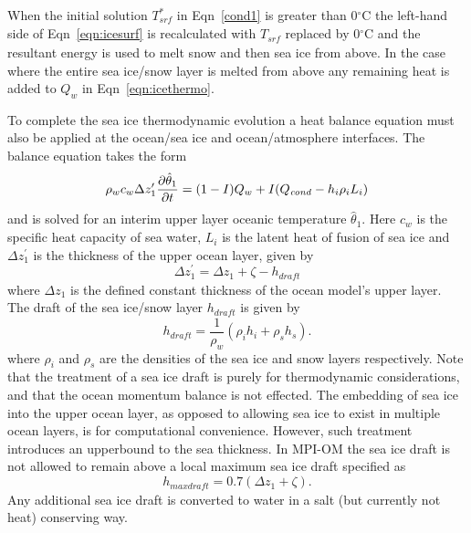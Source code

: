 When the initial solution $T_{\mathit{srf}}^{\ast}$ in Eqn~\ref{cond1}
is greater than 0$^{\circ}$C
the left-hand side of Eqn~\ref{eqn:icesurf} is recalculated with
$T_{\mathit{srf}}$ replaced by 0$^{\circ}$C and the resultant
energy  is used to melt snow and then sea ice from above.
In the case where the entire sea ice/snow layer is melted from
above any remaining heat is added to $Q_w$ in
Eqn~\ref{eqn:icethermo}.

To complete the sea ice thermodynamic evolution a heat balance
equation must also be applied at
the ocean/sea ice and ocean/atmosphere interfaces.
The balance equation takes the form
\begin{equation}
\label{iceundersurf}
\rho_w c_w \Delta{z}_{1}^{\prime}{\partial{\hat{\theta}_1} \over{\partial t}} =
(1-I) Q_w + I(Q_{\mathit{cond}} - h_i \rho_i L_i)
\end{equation}
and is solved for an interim upper layer oceanic temperature $\hat{\theta}_1$.
Here $c_w$ is the specific heat capacity of sea water,
$L_i$ is the latent heat of fusion of sea ice
and $\Delta{z}_{1}^{\prime}$ is the thickness of the upper ocean layer,
given by
\begin{equation}
\label{eqn:draft}
\Delta{z}_{1}^{\prime} = \Delta{z}_{1} + \zeta - h_{\mathit{draft}}
\end{equation}
where $\Delta{z}_{1}$ is the defined constant thickness of the ocean model's upper layer.
The draft of the sea ice/snow layer $h_{\mathit{draft}}$ is given by
\begin{equation}
\label{eqn:draft2}
h_{\mathit{draft}} = \frac{1}{\rho_w}
\left( \rho_ih_i + \rho_sh_s \right).
\end{equation}
where $\rho_i$ and $\rho_s$ are the densities
of the sea ice and snow layers respectively.
Note that the treatment of a sea ice draft is purely for thermodynamic considerations,
and that the ocean momentum balance is not effected.
The embedding of sea ice into the upper ocean layer,
as opposed to allowing sea ice to exist in multiple ocean layers,
is for computational convenience.
However, such treatment introduces an upperbound to the sea thickness.
In \mbox{MPI-OM} the sea ice draft is not allowed to remain above a local
maximum sea ice draft specified as
\begin{equation}
\label{eqn:maxice}
h_{\mathit{maxdraft}} = 0.7 (\Delta{z}_{1} + \zeta).
\end{equation}
Any additional sea ice draft is converted to water
in a salt (but currently not heat) conserving way.
